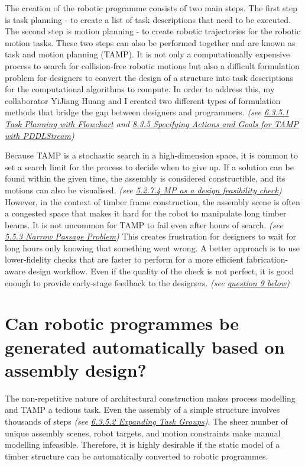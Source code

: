 \documentclass[11pt]{book}
\begin{document}
The creation of the robotic programme consists of two main steps. The first step is task planning - to create a list of task descriptions that need to be executed. The second step is motion planning - to create robotic trajectories for the robotic motion tasks. These two steps can also be performed together and are known as task and motion planning (TAMP). It is not only a computationally expensive process to search for collision-free robotic motions but also a difficult formulation problem for designers to convert the design of a structure into task descriptions for the computational algorithms to compute. In order to address this, my collaborator YiJiang Huang and I created two different types of formulation methods that bridge the gap between designers and programmers. \textit{(see \uline{6.3.5.1 Task Planning with Flowchart} and \uline{8.3.5 Specifying Actions and Goals for TAMP with PDDLStream})}

Because TAMP is a stochastic search in a high-dimension space, it is common to set a search limit for the process to decide when to give up. If a solution can be found within the given time, the assembly is considered constructible, and its motions can also be visualised. \textit{(see \uline{5.2.7.4 MP as a design feasibility check})} However, in the context of timber frame construction, the assembly scene is often a congested space that makes it hard for the robot to manipulate long timber beams. It is not uncommon for TAMP to fail even after hours of search. \textit{(see \uline{5.5.3 Narrow Passage Problem}) }This creates frustration for designers to wait for long hours only knowing that something went wrong. A better approach is to use lower-fidelity checks that are faster to perform for a more efficient fabrication-aware design workflow. Even if the quality of the check is not perfect, it is good enough to provide early-stage feedback to the designers. \textit{(see \uline{question 9 below})}

\section{Can robotic programmes be generated automatically based on assembly design?}

The non-repetitive nature of architectural construction makes process modelling and TAMP a tedious task. Even the assembly of a simple structure involves thousands of steps\textit{ (see \uline{6.3.5.2 Expanding Task Groups})}. The sheer number of unique assembly scenes, robot targets, and motion constraints make manual modelling infeasible. Therefore, it is highly desirable if the static model of a timber structure can be automatically converted to robotic programmes.
\end{document}
